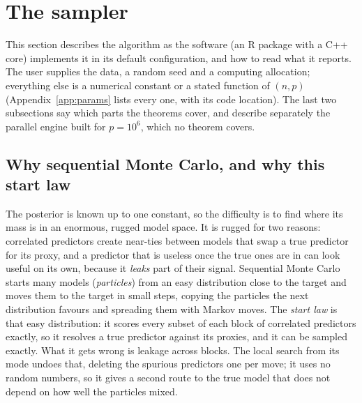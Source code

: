 \section{The sampler}\label{sec:sampler}

This section describes the algorithm as the software (an R package with a C++ core) implements it in its default
configuration, and how to read what it reports. The user supplies the data, a random seed and a computing allocation;
everything else is a numerical constant or a stated function of $(n,p)$ (Appendix~\ref{app:params} lists every one, with its code location). The last two
subsections say which parts the theorems cover, and describe separately the parallel engine built for $p=10^6$, which no
theorem covers.

\subsection{Why sequential Monte Carlo, and why this start law}\label{sec:intuition}

The posterior is known up to one constant, so the difficulty is to find where its mass is in an enormous, rugged model
space. It is rugged for two reasons: correlated predictors create near-ties between models that swap a true predictor for
its proxy, and a predictor that is useless once the true ones are in can look useful on its own, because it \emph{leaks}
part of their signal. Sequential Monte Carlo starts many models (\emph{particles}) from an easy distribution close to the
target and moves them to the target in small steps, copying the particles the next distribution favours and spreading
them with Markov moves. The \emph{start law} is that easy distribution: it scores every subset of each block of correlated
predictors exactly, so it resolves a true predictor against its proxies, and it can be sampled exactly. What it gets wrong
is leakage across blocks. The local search from its mode undoes that, deleting the spurious predictors one per move; it
uses no random numbers, so it gives a second route to the true model that does not depend on how well the particles
mixed.

